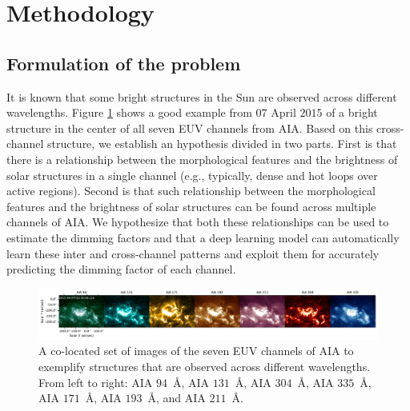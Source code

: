 \documentclass{aa}
\begin{document}
\section{Methodology}
\label{section:methodology}
\subsection{Formulation of the problem}
\label{section:formulation}
It is known that some bright structures in the Sun are observed across different wavelengths. Figure \ref{fig:morphology} shows a good example from $07$ April $2015$ of a bright structure in the center of all seven EUV channels from AIA. Based on this cross-channel structure, we establish an hypothesis divided in two parts. First is that there is a relationship between the morphological features and the brightness of solar structures in a single channel (e.g., typically, dense and hot loops over active regions). Second is that such relationship between the morphological features and the brightness of solar structures can be found across multiple channels of AIA. We hypothesize that both these relationships can be used to estimate the dimming factors and that a deep learning model can automatically learn these inter and cross-channel patterns and exploit them for accurately predicting the dimming factor of each channel. 

\begin{figure}
    \includegraphics[width=\textwidth]{Morphology_AIA.pdf}
    \caption{A co-located set of images of the seven EUV channels of AIA to exemplify structures that are observed across different wavelengths. From left to right: AIA $94$~\AA, AIA $131$~\AA, AIA $304$~\AA, AIA $335$~\AA, AIA $171$~\AA, AIA $193$~\AA, and AIA $211$~\AA.}
    \label{fig:morphology}
\end{figure}
\end{document}
